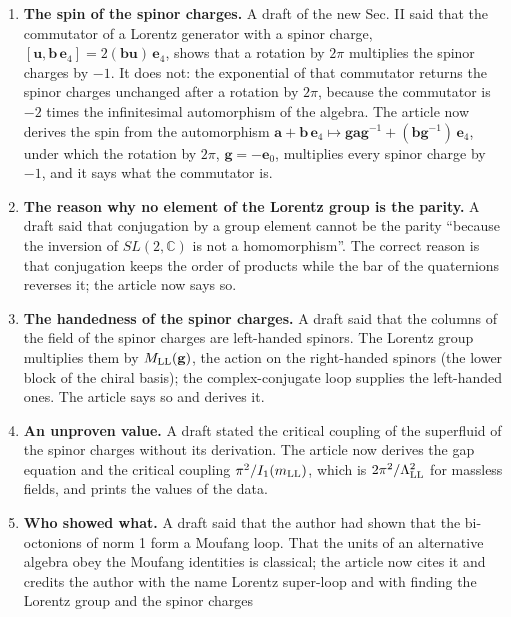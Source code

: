 \documentclass[
  10pt,
]{article}
\providecommand{\tightlist}{%
  \setlength{\itemsep}{0pt}\setlength{\parskip}{0pt}}
\begin{document}
\begin{enumerate}
\def\labelenumi{\arabic{enumi}.}
\setcounter{enumi}{19}
\tightlist
\item
  \textbf{The spin of the spinor charges.} A draft of the new Sec. II
  said that the commutator of a Lorentz generator with a spinor charge,
  \([\mathbf u,\mathbf b\,\mathbf e_4]=2(\mathbf b\mathbf u)\,\mathbf e_4\),
  shows that a rotation by \(2\pi\) multiplies the spinor charges by
  \(-1\). It does not: the exponential of that commutator returns the
  spinor charges unchanged after a rotation by \(2\pi\), because the
  commutator is \(-2\) times the infinitesimal automorphism of the
  algebra. The article now derives the spin from the automorphism
  \(\mathbf a+\mathbf b\,\mathbf e_4\mapsto\mathbf g\mathbf a\mathbf g^{-1}+(\mathbf b\mathbf g^{-1})\,\mathbf e_4\),
  under which the rotation by \(2\pi\), \(\mathbf g=-\mathbf e_0\),
  multiplies every spinor charge by \(-1\), and it says what the
  commutator is.
\item
  \textbf{The reason why no element of the Lorentz group is the parity.}
  A draft said that conjugation by a group element cannot be the parity
  ``because the inversion of \(SL(2,\mathbb C)\) is not a
  homomorphism''. The correct reason is that conjugation keeps the order
  of products while the bar of the quaternions reverses it; the article
  now says so.
\item
  \textbf{The handedness of the spinor charges.} A draft said that the
  columns of the field of the spinor charges are left-handed spinors.
  The Lorentz group multiplies them by \(M_{\rm LL}(\mathbf g)\), the
  action on the right-handed spinors (the lower block of the chiral
  basis); the complex-conjugate loop supplies the left-handed ones. The
  article says so and derives it.
\item
  \textbf{An unproven value.} A draft stated the critical coupling of
  the superfluid of the spinor charges without its derivation. The
  article now derives the gap equation and the critical coupling
  \(\pi^2/I_1(m_{\rm LL})\), which is \(2\pi^2/\Lambda_{\rm LL}^2\) for
  massless fields, and prints the values of the data.
\item
  \textbf{Who showed what.} A draft said that the author had shown that
  the bi-octonions of norm 1 form a Moufang loop. That the units of an
  alternative algebra obey the Moufang identities is classical; the
  article now cites it and credits the author with the name Lorentz
  super-loop and with finding the Lorentz group and the spinor charges

\end{enumerate}
\end{document}
